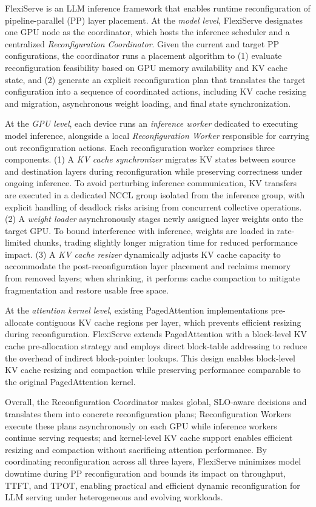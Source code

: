 \documentclass[sigplan,screen]{acmart}
\begin{document}
FlexiServe is an LLM inference framework that enables runtime reconfiguration of pipeline-parallel (PP) layer placement. At the \emph{model level}, FlexiServe designates one GPU node as the coordinator, which hosts the inference scheduler and a centralized \emph{Reconfiguration Coordinator}. Given the current and target PP configurations, the coordinator runs a placement algorithm to (1) evaluate reconfiguration feasibility based on GPU memory availability and KV cache state, and (2) generate an explicit reconfiguration plan that translates the target configuration into a sequence of coordinated actions, including KV cache resizing and migration, asynchronous weight loading, and final state synchronization.

At the \emph{GPU level}, each device runs an \emph{inference worker} dedicated to executing model inference, alongside a local \emph{Reconfiguration Worker} responsible for carrying out reconfiguration actions. Each reconfiguration worker comprises three components. (1) A \emph{KV cache synchronizer} migrates KV states between source and destination layers during reconfiguration while preserving correctness under ongoing inference. To avoid perturbing inference communication, KV transfers are executed in a dedicated NCCL group isolated from the inference group, with explicit handling of deadlock risks arising from concurrent collective operations. (2) A \emph{weight loader} asynchronously stages newly assigned layer weights onto the target GPU. To bound interference with inference, weights are loaded in rate-limited chunks, trading slightly longer migration time for reduced performance impact. (3) A \emph{KV cache resizer} dynamically adjusts KV cache capacity to accommodate the post-reconfiguration layer placement and reclaims memory from removed layers; when shrinking, it performs cache compaction to mitigate fragmentation and restore usable free space.

At the \emph{attention kernel level}, existing PagedAttention implementations pre-allocate contiguous KV cache regions per layer, which prevents efficient resizing during reconfiguration. FlexiServe extends PagedAttention with a block-level KV cache pre-allocation strategy and employs direct block-table addressing to reduce the overhead of indirect block-pointer lookups. This design enables block-level KV cache resizing and compaction while preserving performance comparable to the original PagedAttention kernel.

Overall, the Reconfiguration Coordinator makes global, SLO-aware decisions and translates them into concrete reconfiguration plans; Reconfiguration Workers execute these plans asynchronously on each GPU while inference workers continue serving requests; and kernel-level KV cache support enables efficient resizing and compaction without sacrificing attention performance. By coordinating reconfiguration across all three layers, FlexiServe minimizes model downtime during PP reconfiguration and bounds its impact on throughput, TTFT, and TPOT, enabling practical and efficient dynamic reconfiguration for LLM serving under heterogeneous and evolving workloads.
\end{document}
